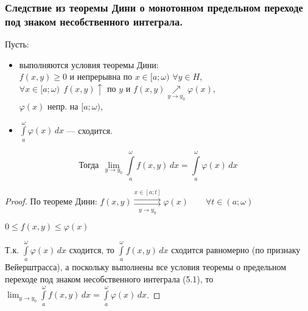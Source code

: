 \subsubsection{Следствие из теоремы Дини о монотонном предельном переходе под знаком несобственного интеграла.}
\begin{corollary}
	Пусть:
	\begin{itemize}
		\item выполняются условия теоремы Дини: \\
		$f(x, y) \ge 0$ и непрерывна по $x \in [a; \omega)$ $\forall y \in H$, \\
		$\forall x \in [a; \omega) \ \ f(x, y) \uparrow$ по $y$ и $f(x, y) \underset{y \to y_0}{\nearrow} \varphi(x)$, \\
		$\varphi(x)$ непр. на $[a; \omega)$,
		\item $\int\limits_a^{\omega} \varphi(x)\,dx$ --- сходится.
	\end{itemize}
	\[ \text{Тогда} \ \ \lim_{y \to y_0} \int\limits_a^{\omega} f(x, y)\,dx = \int\limits_a^{\omega} \varphi(x)\,dx \]
\end{corollary}
\begin{proof}
    По теореме Дини: $f(x, y) \overset{x \in [a; t]}{\underset{y \to y_0}{\rightrightarrows}} \varphi(x) \qquad
    \forall t \in (a; \omega)$
    
    $0 \le f(x, y) \le \varphi(x)$
    
    Т.к. $\int\limits_a^{\omega} \varphi(x)\,dx$ сходится, то $\int\limits_a^{\omega} f(x, y)\,dx$ сходится равномерно (по признаку Вейерштрасса),
    а поскольку выполнены все условия теоремы о предельном переходе под знаком несобственного интеграла (5.1),
    то $\lim_{y \to y_0} \int\limits_a^{\omega} f(x, y)\,dx = \int\limits_a^{\omega} \varphi(x)\,dx$.
\end{proof}


